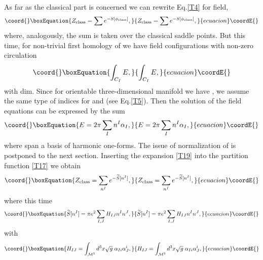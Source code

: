 \documentclass[a4paper,12pt]{article}
\begin{document}
As far as the classical part is concerned we can rewrite Eq.\eqref{T4} for \myHighlight{$\phi$}\coordHE{} field,
\begin{equation}\coord{}\boxEquation{\label{T17}
Z_{\rm class}=\sum e^{-S[\phi_{\rm class}]},
}{Z_{\rm class}=\sum e^{-S[\phi_{\rm class}]},
}{ecuacion}\coordE{}\end{equation}
where, analogously, the sum is taken over the classical saddle points.
But this time, for non-trivial first homology of \coordHE{} we have field configurations
with non-zero circulation
\begin{equation}\coord{}\boxEquation{\label{T18}
\int_{C_{I}} E,
}{\int_{C_{I}} E,
}{ecuacion}\coordE{}\end{equation}
with \coordHE{}dim\coordHE{}. Since for
orientable three-dimensional manifold \coordHE{} we have
\coordHE{}, we assume the same type of indices for \myHighlight{$\Sigma$}\coordHE{} and
\coordHE{} (see Eq.\eqref{T5}). Then the solution of the field equations
can be expressed by the sum
\begin{equation}\coord{}\boxEquation{\label{T19}
E=2\pi\sum_{I} n^{I}\alpha_{I},
}{E=2\pi\sum_{I} n^{I}\alpha_{I},
}{ecuacion}\coordE{}\end{equation}
where \coordHE{}  span a basis of harmonic
one-forms. The issue of normalization of \coordHE{} is postponed to the next section.
Inserting the expansion \eqref{T19} into the partition function
\eqref{T17} we obtain
\begin{equation}\coord{}\boxEquation{\label{T21}
Z_{\rm class}=\sum_{n^{I}} e^{-\widetilde{S}[n^{ I }]},
}{Z_{\rm class}=\sum_{n^{I}} e^{-\widetilde{S}[n^{ I }]},
}{ecuacion}\coordE{}\end{equation}
where this time
\begin{equation}\coord{}\boxEquation{\label{T22}
\widetilde{S} [n^{I}] = \pi e^{2} \sum_{I,J} H_{IJ} n^{I}n^{J},
}{\widetilde{S} [n^{I}] = \pi e^{2} \sum_{I,J} H_{IJ} n^{I}n^{J},
}{ecuacion}\coordE{}\end{equation}
with
\begin{equation}\coord{}\boxEquation{\label{T23}
H_{IJ}=\int_{\mathcal{M}^{3}} d^{3}x
\sqrt{g} \; \alpha_{Ii}\alpha_{J}^{i},
}{H_{IJ}=\int_{\mathcal{M}^{3}} d^{3}x
\sqrt{g} \; \alpha_{Ii}\alpha_{J}^{i},
}{ecuacion}\coordE{}\end{equation}
\end{document}
